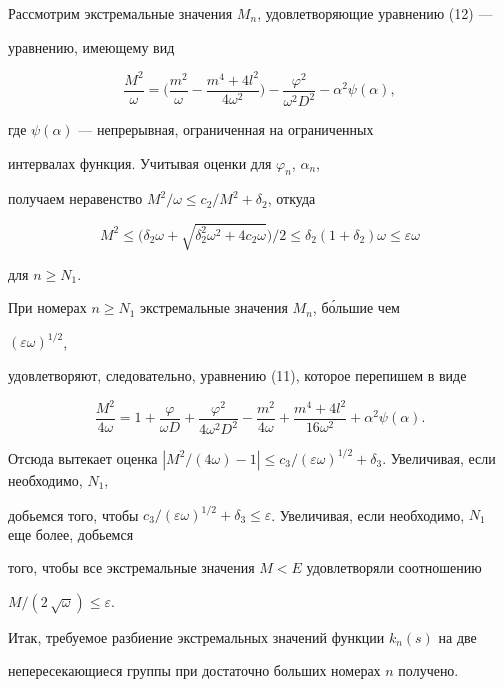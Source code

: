 \begin{pf}
Рассмотрим экстремальные значения $M_n$, удовлетворяющие уравнению (12) ---


уравнению, имеющему вид


$$


\frac{M^2}{\omega}=\bigg(\frac{m^2}{\omega}-\frac{m^4+4 l^2}{4 \omega^2}


\bigg)-\frac{\varphi^2}{\omega^2 D^2} - \alpha^2 \psi (\alpha),


$$


где $\psi (\alpha)$ --- непрерывная, ограниченная на ограниченных


интервалах функция. Учитывая оценки для $\varphi_n$, $\alpha_n$,


получаем неравенство $M^2 / \omega \le c_2 / M^2+\delta_2$, откуда


$$


M^2 \le \big(\delta_2\omega + \sqrt{\delta_2^2\omega^2+4 c_2\omega}


\big) /2 \le \delta_2 (1+\delta_2) \omega \le \varepsilon \omega


$$


для $n \ge N_1$.





При номерах $n \ge N_1$ экстремальные значения $M_n$, б\'ольшие чем


$(\varepsilon \omega)^{1/2}$,


удовлетворяют, следовательно, уравнению (11), которое перепишем в виде


$$


\frac{M^2}{4\omega}=1+ \frac{\varphi}{\omega D}+


\frac{\varphi^2}{4 \omega^2 D^2}-


\frac{m^2}{4 \omega}+\frac{m^4+4 l^2}{16 \omega^2}+\alpha^2 \psi (\alpha).


$$


Отсюда вытекает оценка $|{M^2 / {(4\omega)}-1}| \le c_3 /


(\varepsilon \omega)^{1/2}+\delta_3$. Увеличивая, если необходимо, $N_1$,


добьемся того, чтобы $c_3 / (\varepsilon \omega)^{1/2}+\delta_3 \le


\varepsilon$. Увеличивая, если необходимо, $N_1$ еще более, добьемся


того, чтобы все экстремальные значения $M<E$ удовлетворяли соотношению


$M /(2\, \sqrt{\omega}) \le \varepsilon$.





Итак, требуемое разбиение экстремальных значений функции $k_n(s)$ на две


непересекающиеся группы при достаточно больших номерах $n$ получено.


\end{pf}





